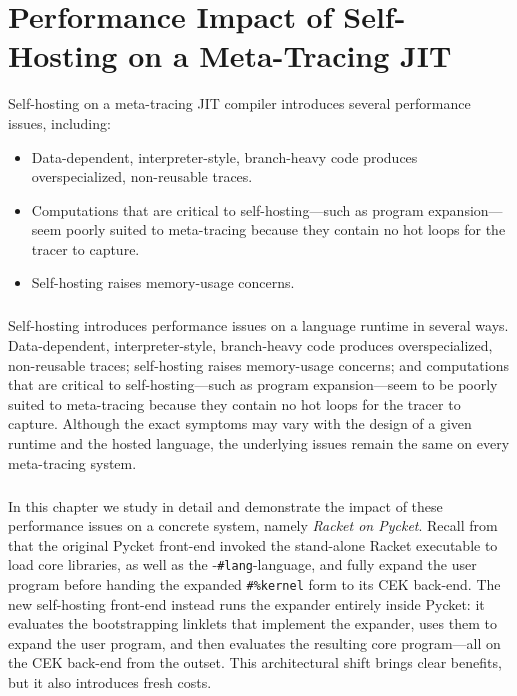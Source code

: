 \chapter{Performance Impact of Self-Hosting on a Meta-Tracing JIT}

	\label{chapter:problem}

	\begin{chapterpoint}
		Self-hosting on a meta-tracing JIT compiler introduces several performance issues, including:
		\begin{itemize}
			\item Data-dependent, interpreter-style, branch-heavy code produces overspecialized, non-reusable traces.
			\item Computations that are critical to self-hosting—such as program expansion—seem poorly suited to meta-tracing because they contain no hot loops for the tracer to capture.
			\item Self-hosting raises memory-usage concerns.
		\end{itemize}
	\end{chapterpoint}

	\paragraph{}%
	 	Self-hosting introduces performance issues on a language runtime in several ways. Data-dependent, interpreter-style, branch-heavy code produces overspecialized, non-reusable traces; self-hosting raises memory-usage concerns; and computations that are critical to self-hosting—such as program expansion—seem to be poorly suited to meta-tracing because they contain no hot loops for the tracer to capture. Although the exact symptoms may vary with the design of a given runtime and the hosted language, the underlying issues remain the same on every meta-tracing system.

	\paragraph{}%
	 	In this chapter we study in detail and demonstrate the impact of these performance issues on a concrete system, namely \emph{Racket on Pycket}. Recall from  that the original Pycket front-end invoked the stand-alone Racket executable to load core libraries, as well as the -\verb|#lang|-language, and fully expand the user program before handing the expanded \verb|#%kernel| form to its CEK back-end. The new self-hosting front-end instead runs the expander entirely inside Pycket: it evaluates the bootstrapping linklets that implement the expander, uses them to expand the user program, and then evaluates the resulting core program—all on the CEK back-end from the outset. This architectural shift brings clear benefits, but it also introduces fresh costs.

